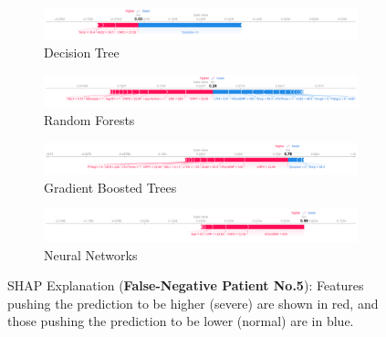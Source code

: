 \begin{figure}
\centering
\begin{subfigure}[b]{1.0\textwidth}
    \centering
    \includegraphics[width=\textwidth]{figures/chapter_interp/shap_dt_5.png}
    \caption{Decision Tree}
    \label{fig:shap_dt_5}
\end{subfigure}
\hfill
\begin{subfigure}[b]{1.0\textwidth}
    \centering
    \includegraphics[width=\textwidth]{figures/chapter_interp/shap_rf_5.png}
    \caption{Random Forests}
    \label{fig:shap_rf_5}
\end{subfigure}
\hfill
\begin{subfigure}[b]{1.0\textwidth}
    \centering
    \includegraphics[width=\textwidth]{figures/chapter_interp/shap_xgbc_5.png}
    \caption{Gradient Boosted Trees}
    \label{fig:shap_xgbc_5}
\end{subfigure}
\hfill
\begin{subfigure}[b]{1.0\textwidth}
    \centering
    \includegraphics[width=\textwidth]{figures/chapter_interp/shap_nn_5.png}
    \caption{Neural Networks}
    \label{fig:shap_nn_5}
\end{subfigure}
\hfill
\caption{SHAP Explanation (\textbf{False-Negative Patient No.5}): Features pushing the prediction to be higher (severe) are shown in red,  and those pushing the prediction to be lower (normal) are in blue.}
\label{fig:shap_5}
\end{figure}


